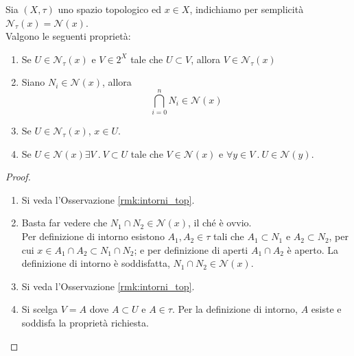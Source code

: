 \begin{proposition}
	Sia $(X,\tau)$ uno spazio topologico ed $x \in X$, indichiamo per semplicità $\mathcal{N}_\tau(x) = \mathcal{N}(x)$. \\ Valgono le seguenti proprietà:
	\begin{enumerate}
		\item Se $U \in \mathcal{N}_\tau(x)$ e $V \in 2^X$ tale che $U \subset V$, allora $V \in \mathcal{N}_\tau(x)$
		\item Siano $N_i \in \mathcal{N}(x)$, allora 
		\begin{equation*}
			\bigcap^{n}_{i=0} N_i \in \mathcal{N}(x)
		\end{equation*}
		\item Se $U \in \mathcal{N}_\tau(x)$, $x \in U$. 
		\item Se $U \in \mathcal{N}(x) \exists V\ .\ V \subset U$ tale che $V \in \mathcal{N}(x)$ e $\forall y \in V\ .\ U \in \mathcal{N}(y)$.
	\end{enumerate}
\end{proposition}
\begin{proof} \
	\begin{enumerate}
		\item Si veda l'Osservazione \ref{rmk:intorni_top}.
		\item Basta far vedere che $N_1 \cap N_2 \in \mathcal{N}(x)$, il ché è ovvio. \\ Per definizione di intorno 
			esistono $A_1, A_2 \in \tau$ tali che $A_1 \subset N_1$ e $A_2 \subset N_2$, per cui $x \in A_1 \cap A_2 \subset N_1 \cap 
			N_2$; e per definizione di aperti $A_1 \cap A_2$ è aperto.  La definizione di intorno è soddisfatta, 
			$N_1 \cap N_2 \in \mathcal{N}(x)$.
		\item Si veda l'Osservazione \ref{rmk:intorni_top}.
		\item Si scelga $V = A$ dove $A \subset U$ e $A \in \tau$. Per la definizione di intorno, $A$ esiste e soddisfa la proprietà richiesta. 
	\end{enumerate}
\end{proof}  

